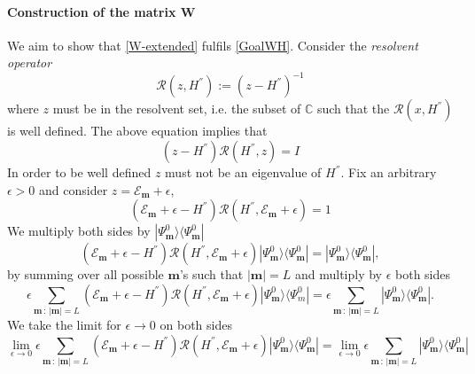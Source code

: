 \documentclass[10pt]{article}
\numberwithin{equation}{section}
\numberwithin{equation}{subsection}
\begin{document}
\paragraph{Construction of the matrix W}
We aim to show that \eqref{W-extended} fulfils \eqref{GoalWH}. Consider the \textit{resolvent operator}
\begin{equation}
	\mathcal{R}(z,H^{''}):=\left(z-H^{''}\right)^{-1}
\end{equation}
where $z$ must be in the resolvent set, i.e. the subset of $\mathbb{C}$ such that the $\mathcal{R}(x,H^{''})$ is well defined. 
The above equation implies that 
\begin{equation}
	(z-H^{''})\mathcal{R}(H^{''},z)=I
\end{equation}
In order to be well defined $z$ must not be an eigenvalue of $H^{''}$. Fix an arbitrary $\epsilon>0$ and consider $z=\mathcal{E}_{\bm{m}}+\epsilon$, 
\begin{equation}
	(\mathcal{E}_{\bm{m}}+\epsilon-H^{''})\mathcal{R}(H^{''},\mathcal{E}_{\bm{m}}+\epsilon)=1
\end{equation}
We multiply both sides by $|\Psi_{\bm{m}}^{0}\rangle \langle \Psi_{\bm{m}}^{0}|$
\begin{equation}
	(\mathcal{E}_{\bm{m}}+\epsilon-H^{''})\mathcal{R}(H^{''},\mathcal{E}_{\bm{m}}+\epsilon)|\Psi_{\bm{m}}^{0}\rangle \langle \Psi_{\bm{m}}^{0}|=|\Psi_{\bm{m}}^{0}\rangle \langle \Psi_{\bm{m}}^{0}|,
\end{equation}
by summing over all possible $\bm{m}$'s such that $|\bm{m}|=L$ and multiply by $\epsilon$ both sides
\begin{equation}
	\epsilon\sum_{\bm{m}\,:\, |\bm{m}|=L}  (\mathcal{E}_{\bm{m}}+\epsilon-H^{''})\mathcal{R}(H^{''},\mathcal{E}_{\bm{m}}+\epsilon)|\Psi_{\bm{m}}^{0}\rangle \langle \Psi_{m}^{0}|=\epsilon\sum_{\bm{m}\,:\, |\bm{m}|=L}|\Psi_{\bm{m}}^{0}\rangle \langle \Psi_{\bm{m}}^{0}|.
\end{equation}
We take the limit for $\epsilon\to 0$ on both sides 
\begin{equation}
	\lim_{\epsilon\to 0}\epsilon\sum_{\bm{m}\,:\, |\bm{m}|=L} (\mathcal{E}_{\bm{m}}+\epsilon-H^{''})\mathcal{R}(H^{''},\mathcal{E}_{\bm{m}}+\epsilon)|\Psi_{\bm{m}}^{0}\rangle \langle \Psi_{\bm{m}}^{0}|=\lim_{\epsilon\to 0}\epsilon\sum_{\bm{m}\,:\,|\bm{m}|=L}|\Psi_{\bm{m}}^{0}\rangle \langle \Psi_{\bm{m}}^{0}|
\end{equation}
\end{document}
